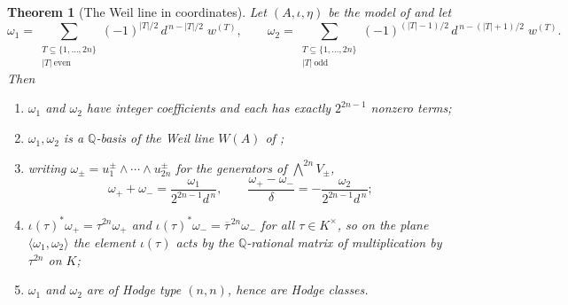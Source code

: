 \documentclass[11pt,reqno]{amsart}
\theoremstyle{plain}
\newtheorem{theorem}{Theorem}[section]
\theoremstyle{definition}
\theoremstyle{remark}
\newcommand{\QQ}{\mathbb{Q}}
\newcommand{\HW}{W}                      %
\newcommand{\Kx}{K^{\times}}
\newcommand{\bbar}[1]{\overline{#1}}
\begin{document}
\begin{theorem}[The Weil line in coordinates]\label{thm:explicitgens}
Let $(A,\iota,\eta)$ be the model of  and let
\begin{equation}\label{eq:omegagens}
  \omega_{1}=\sum_{\substack{T\subseteq\{1,\dots,2n\}\\ |T|\ \mathrm{even}}}
    (-1)^{|T|/2}\,d^{\,n-|T|/2}\;w^{(T)},
  \qquad
  \omega_{2}=\sum_{\substack{T\subseteq\{1,\dots,2n\}\\ |T|\ \mathrm{odd}}}
    (-1)^{(|T|-1)/2}\,d^{\,n-(|T|+1)/2}\;w^{(T)} .
\end{equation}
Then
\begin{enumerate}[label=\textup{(\roman*)},nosep]
\item $\omega_{1}$ and $\omega_{2}$ have integer coefficients and each has
  exactly $2^{2n-1}$ nonzero terms;
\item $\omega_{1},\omega_{2}$ is a $\QQ$-basis of the Weil line
  $\HW(A)$ of ;
\item writing $\omega_{\pm}=u_{1}^{\pm}\wedge\cdots\wedge u_{2n}^{\pm}$ for the
  generators of $\bigwedge^{2n}V_{\pm}$,
  \[
    \omega_{+}+\omega_{-}=\frac{\omega_{1}}{2^{2n-1}d^{\,n}},
    \qquad
    \frac{\omega_{+}-\omega_{-}}{\delta}=-\frac{\omega_{2}}{2^{2n-1}d^{\,n}} ;
  \]
\item $\iota(\tau)^{*}\omega_{+}=\tau^{2n}\omega_{+}$ and
  $\iota(\tau)^{*}\omega_{-}=\bbar{\tau}^{\,2n}\omega_{-}$ for all
  $\tau\in\Kx$, so on the plane $\langle\omega_{1},\omega_{2}\rangle$ the
  element $\iota(\tau)$ acts by the $\QQ$-rational matrix of multiplication by
  $\tau^{2n}$ on $K$;
\item $\omega_{1}$ and $\omega_{2}$ are of Hodge type $(n,n)$, hence are Hodge
  classes.
\end{enumerate}
\end{theorem}
\end{document}
